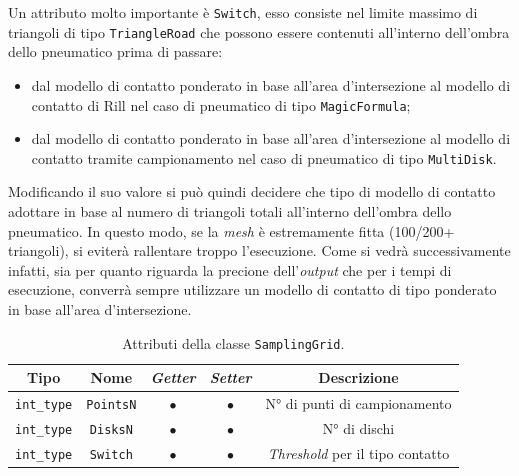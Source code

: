 Un attributo molto importante è \texttt{Switch}, esso consiste nel limite massimo di triangoli di tipo \texttt{TriangleRoad} che possono essere contenuti all'interno dell'ombra dello pneumatico prima di passare:
\begin{itemize}
	\item dal modello di contatto ponderato in base all'area d'intersezione al modello di contatto di Rill nel caso di pneumatico di tipo \texttt{MagicFormula};
	\item dal modello di contatto ponderato in base all'area d'intersezione al modello di contatto tramite campionamento nel caso di pneumatico di tipo \texttt{MultiDisk}.
\end{itemize}
Modificando il suo valore si può quindi decidere che tipo di modello di contatto adottare in base al numero di triangoli totali all'interno dell'ombra dello pneumatico. In questo modo, se la \textit{mesh} è estremamente fitta (100/200+ triangoli), si eviterà rallentare troppo l'esecuzione. Come si vedrà successivamente infatti, sia per quanto riguarda la precione dell'\textit{output} che per i tempi di esecuzione, converrà sempre utilizzare un modello di contatto di tipo ponderato in base all'area d'intersezione.
%
\begin{table}[h!]
	\centering
	\begin{tabular}{|c|c|c|c|c|}
		\hline 
		\textbf{Tipo} & \textbf{Nome} & \textit{\textbf{Getter}} & \textit{\textbf{Setter}} & \textbf{Descrizione} \\ \hline 
		\texttt{int\_type} & \texttt{PointsN} & $\bullet$ & $\bullet$ & N° di punti di campionamento \\ \hline 
		\texttt{int\_type} & \texttt{DisksN} & $\bullet$ & $\bullet$ & N° di dischi \\ \hline 
		\texttt{int\_type} & \texttt{Switch} & $\bullet$ & $\bullet$ & \textit{Threshold} per il tipo contatto \\ \hline
	\end{tabular}
	\caption{Attributi della classe \texttt{SamplingGrid}.}
	\label{}
\end{table}
%
